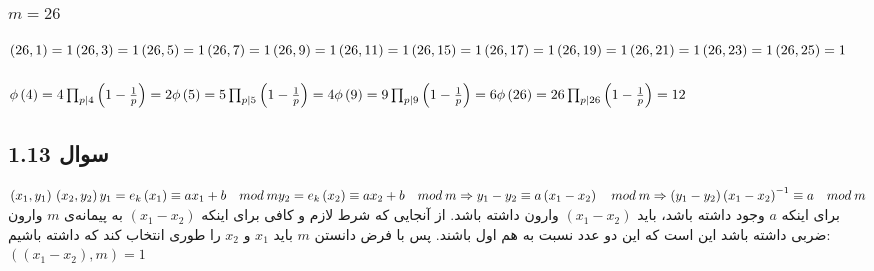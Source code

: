 \documentclass{article}
\begin{document}
\subsubsection{$m = 26$}
$
\left( 26, 1 \right) = 1 \\
\left( 26, 3 \right) = 1 \\
\left( 26, 5 \right) = 1 \\
\left( 26, 7 \right) = 1 \\
\left( 26, 9 \right) = 1 \\
\left( 26, 11 \right) = 1 \\
\left( 26, 15 \right) = 1 \\
\left( 26, 17 \right) = 1 \\
\left( 26, 19 \right) = 1 \\
\left( 26, 21 \right) = 1 \\
\left( 26, 23 \right) = 1 \\
\left( 26, 25 \right) = 1 \\ \\ \\ \\
$

\subsubsection{}
$
\phi\left( 4 \right) = 4\prod_{p | 4} \left( 1 - \frac{1}{p} \right) = 2 \\
\phi\left( 5 \right) = 5\prod_{p | 5} \left( 1 - \frac{1}{p} \right) = 4 \\
\phi\left( 9 \right) = 9\prod_{p | 9} \left( 1 - \frac{1}{p} \right) = 6 \\
\phi\left( 26 \right) = 26\prod_{p | 26} \left( 1 - \frac{1}{p} \right) = 12 \\
$



\subsection{سوال 1.13}
$
\left( x_1, y_1 \right) \\
\left( x_2, y_2 \right) \\ \\
y_1 = e_k\left( x_1 \right) \equiv  a x_1 + b \quad mod \: m \\
y_2 = e_k\left( x_2 \right) \equiv  a x_2 + b \quad mod \: m \\ \\
\Rightarrow y_1 - y_2 \equiv a\left( x_1 - x_2 \right) \quad mod \: m \\
\Rightarrow \left( y_1 - y_2 \right) \left( x_1 - x_2 \right) ^ {-1} \equiv a \quad mod \: m \\
$
برای اینکه $a$ وجود داشته باشد، باید $\left( x_1 - x_2 \right)$ وارون داشته باشد. از آنجایی که شرط لازم و کافی برای اینکه $\left( x_1 - x_2 \right)$ به پیمانه‌ی $m$ وارون ضربی داشته باشد این است که این دو عدد نسبت به هم اول باشند. پس  با فرض دانستن $m$ باید $x_1$ و $x_2$ را طوری انتخاب کند که داشته باشیم:\\
$
\left( \left( x_1 - x_2 \right), m \right) = 1
$
\end{document}
